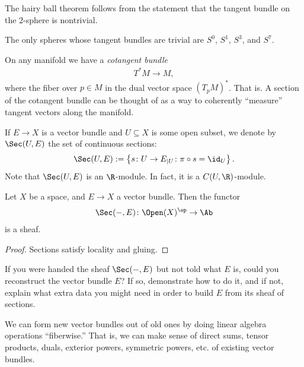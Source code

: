 \documentclass[11pt]{amsart}
\begin{document}
\begin{example} The hairy ball theorem follows from the statement that the tangent bundle on the $2$-sphere is nontrivial.
\end{example}

\begin{theorem} The only spheres whose tangent bundles are trivial are $S^0$, $S^1$, $S^3$, and $S^7$.
\end{theorem}

\begin{example} On any manifold we have a \emph{cotangent bundle}
\begin{align*}
    T^\ast M \to M,
\end{align*}
where the fiber over $p\in M$ in the dual vector space $(T_p M)^\ast$. That is. A section of the cotangent bundle can be thought of as a way to coherently ``measure'' tangent vectors along the manifold.
\end{example}

\begin{notation} If $E\to X$ is a vector bundle and $U \subseteq X$ is some open subset, we denote by $\Sec(U,E)$ the set of continuous sections:
\begin{align*}
    \Sec(U,E) := \left\{ s \colon U \to E_{|U} \colon \pi\circ s = \id_U \right\}.
\end{align*}
Note that $\Sec(U,E)$ is an $\R$-module. In fact, it is a $C(U,\R)$-module.
\end{notation}

\begin{proposition} Let $X$ be a space, and $E \to X$ a vector bundle. Then the functor
\begin{align*}
    \Sec(-,E) \colon \Open(X)^\op \to \Ab
\end{align*}
is a sheaf.
\end{proposition}
\begin{proof} Sections satisfy locality and gluing. 
\end{proof}

\begin{question} If you were handed the sheaf $\Sec(-,E)$ but not told what $E$ is, could you reconstruct the vector bundle $E$? If so, demonstrate how to do it, and if not, explain what extra data you might need in order to build $E$ from its sheaf of sections.
\end{question}

\begin{remark} We can form new vector bundles out of old ones by doing linear algebra operations ``fiberwise.'' That is, we can make sense of direct sums, tensor products, duals, exterior powers, symmetric powers, etc. of existing vector bundles.
\end{remark}
\end{document}
